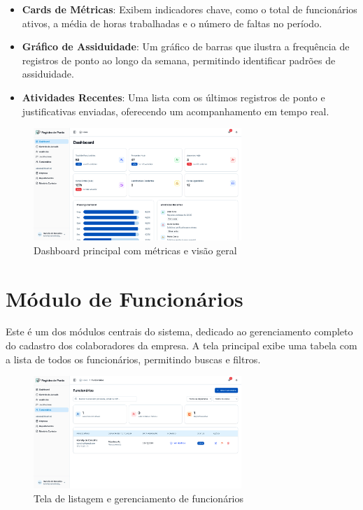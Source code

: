 \begin{itemize}
\item \textbf{Cards de Métricas}: Exibem indicadores chave, como o total de funcionários ativos, a média de horas trabalhadas e o número de faltas no período.
\item \textbf{Gráfico de Assiduidade}: Um gráfico de barras que ilustra a frequência de registros de ponto ao longo da semana, permitindo identificar padrões de assiduidade.
\item \textbf{Atividades Recentes}: Uma lista com os últimos registros de ponto e justificativas enviadas, oferecendo um acompanhamento em tempo real.
\end{itemize}

\begin{figure}[H]
\centering
\includegraphics[width=0.7\textwidth]{imagens/dashboard-principal.png}
\caption{Dashboard principal com métricas e visão geral}
\label{fig:dashboard-principal}
\end{figure}

\section{Módulo de Funcionários}

Este é um dos módulos centrais do sistema, dedicado ao gerenciamento completo do cadastro dos colaboradores da empresa. A tela principal exibe uma tabela com a lista de todos os funcionários, permitindo buscas e filtros.

\begin{figure}[H]
\centering
\includegraphics[width=0.7\textwidth]{imagens/listagem-funcionarios.png}
\caption{Tela de listagem e gerenciamento de funcionários}
\label{fig:listagem-funcionarios}
\end{figure}

